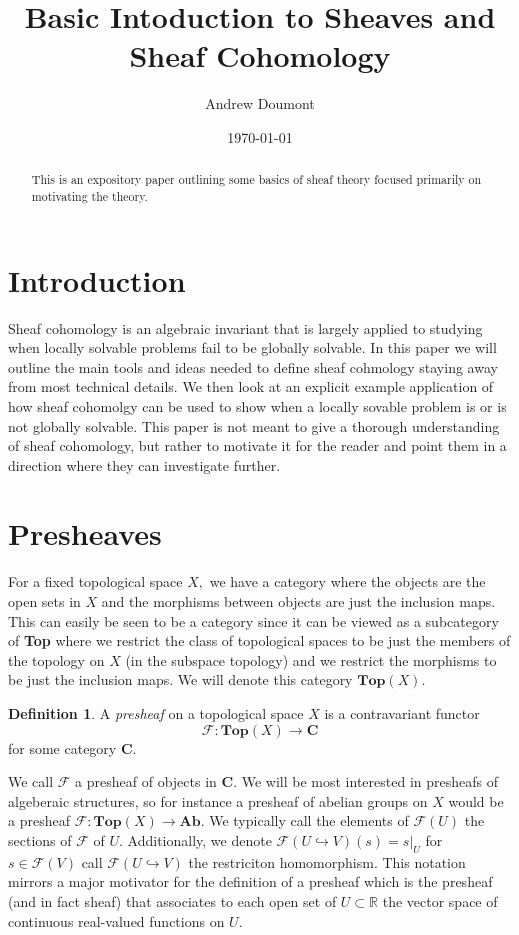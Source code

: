 \documentclass[psamsfonts]{amsart}
\title{Basic Intoduction to Sheaves and Sheaf Cohomology}
\author{Andrew Doumont}
\date{\today}
\theoremstyle{definition}
\newtheorem{defn}[thm]{Definition}
\theoremstyle{remark}
\numberwithin{equation}{section}
\begin{document}
\begin{abstract}
  This is an expository paper outlining some basics of sheaf theory focused primarily on motivating the theory.
  
  
\end{abstract}

\maketitle




\tableofcontents



\section{Introduction}
  Sheaf cohomology is an algebraic invariant that is largely applied to studying when locally solvable problems fail to be globally solvable. In this paper we will outline the main tools and ideas needed to define sheaf cohmology staying away from most technical details. We then look at an explicit example application of how sheaf cohomolgy can be used to show when a locally sovable problem is or is not globally solvable. This paper is not meant to give a thorough understanding of sheaf cohomology, but rather to motivate it for the reader and point them in a direction where they can investigate further.


\section{Presheaves}
  For a fixed topological space $X,$ we have a category where the objects are the open sets in $X$ and the morphisms between objects are just the inclusion maps. This can easily be seen to be a category since it can be viewed as a subcategory of 
  \textbf{Top} where we restrict the class of topological spaces to be just the members of the topology on $X$ (in the subspace topology) and we restrict the morphisms to be just the inclusion maps. We will denote this category $\textbf{Top}(X).$ \cite{hartshorne_1977} 
  
  \begin{defn}
    A \textit{presheaf} on a topological space $X$ is a contravariant functor 
    \[\mathscr{F}: \textbf{Top}(X) \to \textbf{C}\]
    for some category $\textbf{C}.$
  \end{defn}
   We call $\mathscr{F}$ a presheaf of objects in \textbf{C}. \cite{hartshorne_1977} We will be most interested in presheafs of algeberaic structures, so for instance a presheaf of abelian groups on $X$ would be a presheaf $\mathscr{F}:\textbf{Top}(X) \to \textbf{Ab}$. We typically call the elements of $\mathscr{F}(U)$ the sections of $\mathscr{F}$ of $U.$ Additionally, we denote $\mathscr{F}(U \hookrightarrow V)(s) = s|_U$ for $s \in \mathscr{F}(V)$ call $\mathscr{F}(U \hookrightarrow V)$ the restriciton homomorphism. This notation mirrors a major motivator for the definition of a presheaf which is the presheaf (and in fact sheaf) that associates to each open set of $U \subset \mathbb{R}$ the vector space of continuous real-valued functions on $U.$ 
\end{document}
